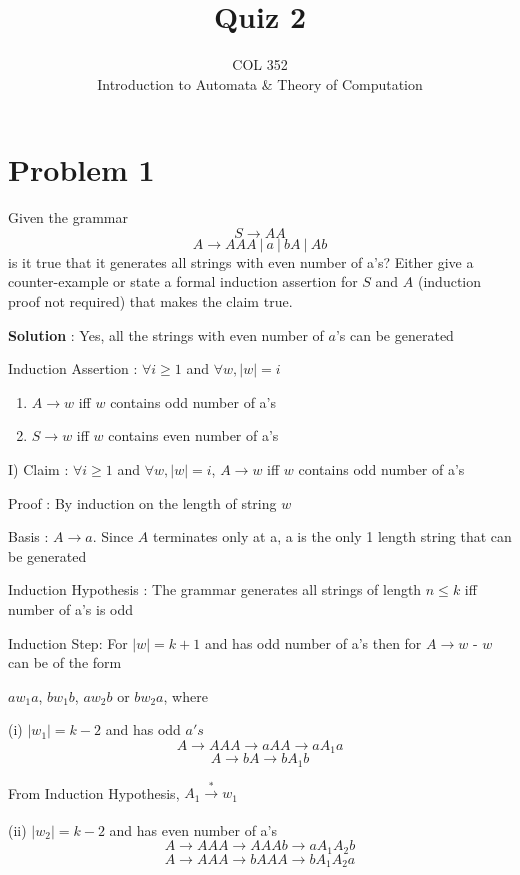 \documentclass{article}
\title{Quiz 2}
\author{COL 352\\
    Introduction to Automata \& 
    Theory of Computation}
\date{}
\begin{document}
    \maketitle
    
    \section*{Problem 1} Given the grammar 
    $$S \rightarrow AA$$
    $$A \rightarrow AAA~|~a~|~bA~|~Ab$$
    is it true that it generates all strings with even number of a's? Either give a counter-example or state a formal induction assertion for $S$ and $A$ (induction proof not required) that makes the claim true.
    
    \textbf{Solution} : Yes, all the strings with even number of $a$'s can be generated
    
    Induction Assertion : $\forall i \geq 1$ and $\forall w, |w| = i$
    \begin{enumerate}
        \item $A \rightarrow w$ iff $w$ contains odd number of a's
        \item $S \rightarrow w$ iff $w$ contains even number of a's
    \end{enumerate}

    I) Claim : $\forall i \geq 1$ and $\forall w, |w| = i$, $A \rightarrow w$ iff $w$ contains odd number of a's
    
    \quad Proof : By induction on the length of string $w$
    
    \quad Basis :   $A \rightarrow a $. Since $A$ terminates only at a, a is the only 1 length string that can be generated
    
    \quad Induction Hypothesis : The grammar generates all strings of length $n \le k$ iff number of a's is odd
    
    \quad Induction Step: For $|w| = k+1$ and has odd number of a's then for $A \rightarrow w$ - $w$ can be of the form 
    
    \quad $aw_{1}a$, $bw_{1}b$, $aw_{2}b$ or $bw_{2}a$, where
    
    \qquad (i) $|w_{1}| = k-2$ and has odd $a's$
    $$A \rightarrow AAA \rightarrow aAA \rightarrow aA_{1}a$$
    $$A \rightarrow bA \rightarrow bA_{1}b$$
    
    \qquad From Induction Hypothesis, $A_{1} \xrightarrow[]{*} w_{1}$
    
    
    \qquad (ii) $|w_{2}| = k-2$ and has even number of a's
    $$A \rightarrow AAA \rightarrow AAAb \rightarrow aA_{1}A_{2}b$$
    $$A \rightarrow AAA \rightarrow bAAA \rightarrow bA_{1}A_{2}a$$
    
\end{document}
